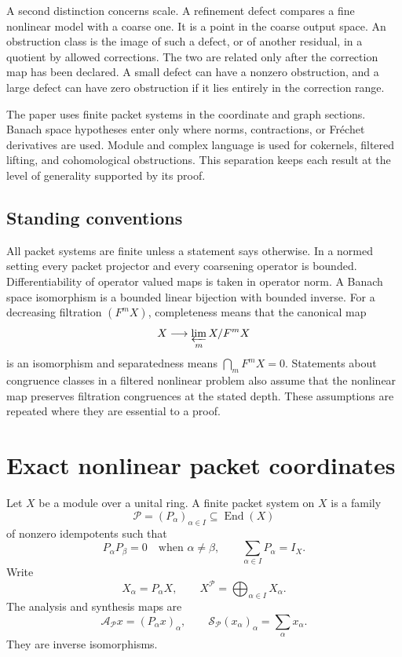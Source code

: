 \documentclass{aomart}
\theoremstyle{definition}
\theoremstyle{remark}
\newcommand{\Acal}{\mathcal A}
\newcommand{\Pcal}{\mathcal P}
\newcommand{\Scal}{\mathcal S}
\newcommand{\End}{\operatorname{End}}
\begin{document}
A second distinction concerns scale.  A refinement defect compares a fine nonlinear model with a coarse one.  It is a point in the coarse output space.  An obstruction class is the image of such a defect, or of another residual, in a quotient by allowed corrections.  The two are related only after the correction map has been declared.  A small defect can have a nonzero obstruction, and a large defect can have zero obstruction if it lies entirely in the correction range.

The paper uses finite packet systems in the coordinate and graph sections.  Banach space hypotheses enter only where norms, contractions, or Fr\'echet derivatives are used.  Module and complex language is used for cokernels, filtered lifting, and cohomological obstructions.  This separation keeps each result at the level of generality supported by its proof.

\subsection*{Standing conventions}
All packet systems are finite unless a statement says otherwise.  In a normed setting every packet projector and every coarsening operator is bounded.  Differentiability of operator valued maps is taken in operator norm.  A Banach space isomorphism is a bounded linear bijection with bounded inverse.  For a decreasing filtration $(F^mX)$, completeness means that the canonical map
\[
X\longrightarrow\varprojlim_m X/F^mX
\]
is an isomorphism and separatedness means $\bigcap_mF^mX=0$.  Statements about congruence classes in a filtered nonlinear problem also assume that the nonlinear map preserves filtration congruences at the stated depth.  These assumptions are repeated where they are essential to a proof.

\section{Exact nonlinear packet coordinates}\label{sec:nonlinear_coordinates}

Let $X$ be a module over a unital ring.  A finite packet system on $X$ is a family
\[
\Pcal=(P_\alpha)_{\alpha\in I}\subseteq\End(X)
\]
of nonzero idempotents such that
\[
P_\alpha P_\beta=0
\quad\text{when }\alpha\ne\beta,
\qquad
\sum_{\alpha\in I}P_\alpha=I_X.
\]
Write
\[
X_\alpha=P_\alpha X,
\qquad
X^{\Pcal}=\bigoplus_{\alpha\in I}X_\alpha.
\]
The analysis and synthesis maps are
\[
\Acal_{\Pcal}x=(P_\alpha x)_\alpha,
\qquad
\Scal_{\Pcal}(x_\alpha)_\alpha=\sum_\alpha x_\alpha.
\]
They are inverse isomorphisms.
\end{document}
